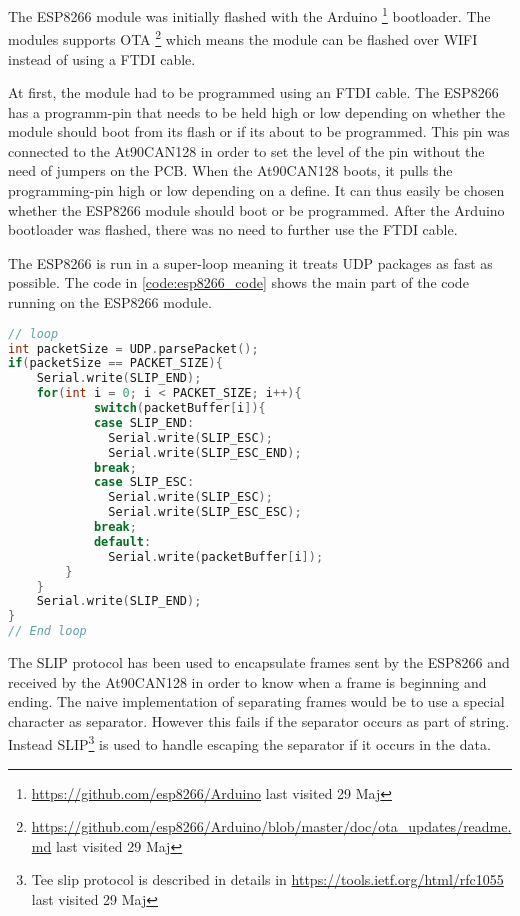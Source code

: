 The ESP8266 module was initially flashed with the Arduino \footnote{\url{https://github.com/esp8266/Arduino} last visited 29 Maj} bootloader.
The modules supports \ac{OTA} \footnote{\url{https://github.com/esp8266/Arduino/blob/master/doc/ota\_updates/readme.md} last visited 29 Maj} which means the module can be flashed over WIFI instead of using a \ac{FTDI} cable.

At first, the module had to be programmed using an \ac{FTDI} cable.
The ESP8266 has a programm-pin that needs to be held high or low depending on whether the module should boot from its flash or if its about to be programmed.
This pin was connected to the At90CAN128 in order to set the level of the pin without the need of jumpers on the \ac{PCB}. When the At90CAN128 boots, it pulls the programming-pin high or low depending on a define.
It can thus easily be chosen whether the ESP8266 module should boot or be programmed.
After the Arduino bootloader was flashed, there was no need to further use the \ac{FTDI} cable.

The ESP8266 is run in a super-loop meaning it treats UDP packages as fast as possible. The code in \ref{code:esp8266_code} shows the main part of the code running on the ESP8266 module.

\begin{lstlisting}[language = C++, caption = Snippet from loop() shows how it processes frames. When a UDP packet is available\, its size is compared with the expected size of a fame. It then loops through each byte received and runs the SLIP encapsulation, label=code:esp8266_code]
// loop
int packetSize = UDP.parsePacket();    
if(packetSize == PACKET_SIZE){
   	Serial.write(SLIP_END);
    for(int i = 0; i < PACKET_SIZE; i++){
    		switch(packetBuffer[i]){
       		case SLIP_END:
       	      Serial.write(SLIP_ESC);
       	      Serial.write(SLIP_ESC_END);
       	    break;         
       	    case SLIP_ESC:
       	      Serial.write(SLIP_ESC);
       	      Serial.write(SLIP_ESC_ESC);
       	    break;
       	    default:
       	      Serial.write(packetBuffer[i]);
		}
	}
	Serial.write(SLIP_END);
}
// End loop
\end{lstlisting}

The \ac{SLIP} protocol has been used to encapsulate frames sent by the ESP8266 and received by the At90CAN128 in order to know when a frame is beginning and ending. 
The naive implementation of separating frames would be to use a special character as separator. However this fails if the separator occurs as part of string. Instead \ac{SLIP}\footnote{Tee slip protocol is described in details in \url{https://tools.ietf.org/html/rfc1055} last visited 29 Maj} is used to handle escaping the separator if it occurs in the data.